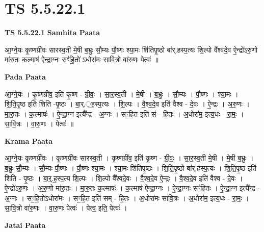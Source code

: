 \documentclass[17pt]{extarticle}
\begin{document}
\section{ TS 5.5.22.1 }

\textbf{TS 5.5.22.1 } \newline
\textbf{Samhita Paata} \newline

आ॒ग्ने॒यः कृ॒ष्णग्री॑वः सारस्व॒ती मे॒षी ब॒भ्रुः सौ॒म्यः पौ॒ष्णः श्या॒मः शि॑तिपृ॒ष्ठो बा॑र्.हस्प॒त्यः शि॒ल्पो वै᳚श्वदे॒व ऐ॒न्द्रो॑ऽरु॒णो मा॑रु॒तः क॒ल्माष॑ ऐन्द्रा॒ग्नः सꣳ॑हि॒तो॑ ऽधोरा॑मः सावि॒त्रो वा॑रु॒णः पेत्वः॑ ॥ \newline

\textbf{Pada Paata} \newline

आ॒ग्ने॒यः । कृ॒ष्णग्री॑व॒ इति॑ कृ॒ष्ण - ग्री॒वः॒ । सा॒र॒स्व॒ती । मे॒षी । ब॒भ्रुः । सौ॒म्यः । पौ॒ष्णः । श्या॒मः । शि॒ति॒पृ॒ष्ठ इति॑ शिति -पृ॒ष्ठः । बा॒र्.॒ह॒स्प॒त्यः । शि॒ल्पः । वै॒श्व॒दे॒व इति॑ वैश्व - दे॒वः । ऐ॒न्द्रः । अ॒रु॒णः । मा॒रु॒तः । क॒ल्माषः॑ । ऐ॒न्द्रा॒ग्न इत्यै᳚न्द्र - अ॒ग्नः । सꣳ॒॒हि॒त इति॑ सं - हि॒तः । अ॒धोरा॑म॒ इत्य॒धः - रा॒मः॒ । सा॒वि॒त्रः । वा॒रु॒णः । पेत्वः॑ ॥  \newline


\textbf{Krama Paata} \newline

आ॒ग्ने॒यः कृ॒ष्णग्री॑वः । कृ॒ष्णग्री॑वः सारस्व॒ती । कृ॒ष्णग्री॑व॒ इति॑ कृ॒ष्ण - ग्री॒वः॒ । सा॒र॒स्व॒ती मे॒षी । मे॒षी ब॒भ्रुः । ब॒भ्रुः सौ॒म्यः । सौ॒म्यः पौ॒ष्णः । पौ॒ष्णः श्या॒मः । श्या॒मः शि॑तिपृ॒ष्ठः । शि॒ति॒पृ॒ष्ठो बा॑र्.हस्प॒त्यः । शि॒ति॒पृ॒ष्ठ इति॑ शिति - पृ॒ष्ठः । बा॒र्॒.ह॒स्प॒त्य शि॒ल्पः । शि॒ल्पो वै᳚श्वदे॒वः । वै॒श्व॒दे॒व ऐ॒न्द्रः । वै॒श्व॒दे॒व इति॑ वैश्व - दे॒वः । ऐ॒न्द्रो॑ऽरु॒णः । अ॒रु॒णो मा॑रु॒तः । मा॒रु॒तः क॒ल्माषः॑ । क॒ल्माष॑ ऐन्द्रा॒ग्नः । ऐ॒न्द्रा॒ग्नः सꣳ॑हि॒तः । ऐ॒न्द्रा॒ग्न इत्यै᳚न्द्र - अ॒ग्नः । सꣳ॒॒हि॒तो॑ऽधोरा॑मः । सꣳ॒॒हि॒त इति॑ सम् - हि॒तः । अ॒धोरा॑मः सावि॒त्रः । अ॒धोरा॑म॒ इत्य॒धः - रा॒मः॒ । सा॒वि॒त्रो वा॑रु॒णः । वा॒रु॒णः पेत्वः॑ । पेत्व॒ इति॒ पेत्वः॑ । \newline

\textbf{Jatai Paata} \newline
\end{document}
